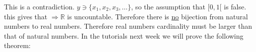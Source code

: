 \documentclass{article}
\begin{document}
 This is a contradiction. $y \ni \{x_1, x_2, x_3, \dots\}$, so the assumption that $[0, 1[$ is false. this gives that  $\Rightarrow \mathbb{R}$ is uncountable. Therefore there is \underline{no} bijection from natural numbers to real numbers. Therefore real numbers cardinality must be larger than that of natural numbers. In the tutorials next week we will prove the following theorem:

 


 
\end{document}
